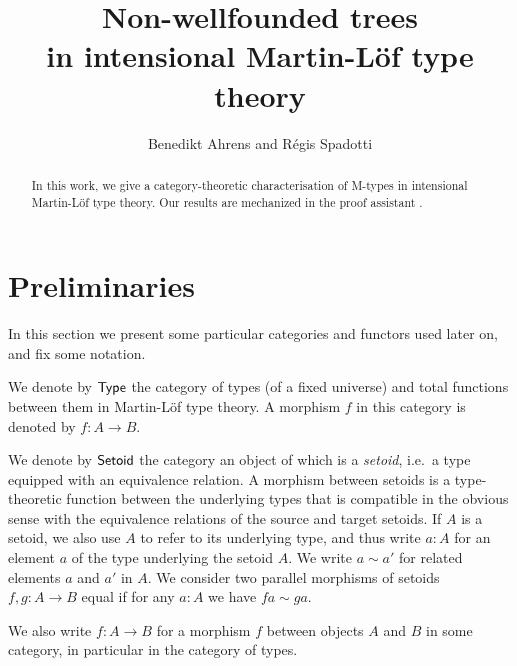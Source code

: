 \documentclass[envcountsame]{llncs}
\begin{document}
\title{Non-wellfounded trees\\in intensional Martin-L\"of type theory}

\author{Benedikt Ahrens and R\'egis Spadotti}


\newcommand{\fat}[1]{\textbf{#1}}
\newcommand{\M}{\constfont{M}}
\renewcommand{\root}{\constfont{root}}
\newcommand{\br}{\constfont{br}}
\newcommand{\transport}{\constfont{transport}}


\maketitle


\begin{abstract}


 In this work, we give a category-theoretic characterisation of \textsf{M}-types in intensional Martin-L\"of type theory.
 Our results are mechanized in the proof assistant \coq.
   
  
  \end{abstract}




 


\section{Preliminaries}\label{sec:preliminaries}

In this section we present some particular categories and functors used later on, and fix some notation.


\begin{definition}\label{def:set_setoid}
 We denote by $\mathsf{Type}$ the category of types (of a fixed universe) and total functions between them in Martin-L\"of type theory. 
 A morphism $f$ in this category is denoted by $f : A \to B$.
 
 We denote by $\mathsf{Setoid}$ the category an object of which is a \emph{setoid}, i.e.\ a type equipped with an equivalence relation.
 A morphism between setoids is a type-theoretic function between the underlying types that is compatible in the obvious sense with the equivalence relations of the source and target setoids.
 If $A$ is a setoid, we also use $A$ to refer to its underlying type, and thus write $a:A$ for an element $a$ of the type underlying the setoid $A$. 
 We write $a\sim a'$ for related elements $a$ and $a'$ in $A$.
 We consider two parallel morphisms of setoids $f,g:A\to B$ equal if for any $a:A$ we have $fa \sim ga$.
 
 We also write $f:A\to B$ for a morphism $f$ between objects $A$ and $B$ in some category, in particular in the category of types.
 \end{definition}
\end{document}

